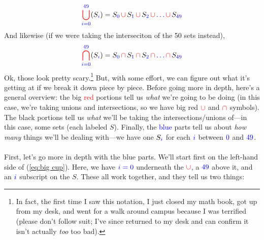 \documentclass[10pt]{article}
\theoremstyle{definition}
\let\oldref\ref
\renewcommand{\ref}[1]{(\oldref{#1})}
\begin{document}
\begin{equation}\label{eq:big cup}
{\color{red}\bigcup^{{\color{blue}49}}_{\color{blue}i={0}}}(S_{\color{blue}i}) = S_{\color{blue}0}\,{\color{red}\cup}\,S_{\color{blue}1}\,{\color{red}\cup} \,S_{\color{blue}2} \,{\color{red}\cup} \,{\color{blue}\ldots} \,{\color{red}\cup}\, S_{\color{blue}49}
\end{equation}
And likewise (if we were taking the interseciton of the 50 sets instead),
\begin{equation}\label{eq:big cap}
{\color{red}\bigcap^{{\color{blue}49}}_{\color{blue}i=0}}(S_{\color{blue}i}) = S_{\color{blue}0}\,{\color{red}\cap}\,S_{\color{blue}1}\,{\color{red}\cap} \,S_{\color{blue}2} \,{\color{red}\cap} \,{\color{blue}\ldots} \,{\color{red}\cap}\, S_{\color{blue}49}
\end{equation}
Ok, those look pretty scary.\footnote{In fact, the first time I saw this notation, I just closed my math book, got up from my desk, and went for a walk around campus because I was terrified (please don't follow suit; I've since returned to my desk and can confirm it isn't actually \emph{too} too bad).}  But, with some effort, we can figure out what it's getting at if we break it down piece by piece.  Before going more in depth, here's a general overview: the big \textcolor{red}{red} portions tell us \emph{what} we're going to be doing (in this case, we're taking unions and intersections, so we have big red $\color{red}\cup$ and $\color{red}\cap$ symbols).  The black portions tell us \emph{what} we'll be taking the intersections/unions of---in this case, some sets (each labeled $S$).  Finally, the \textcolor{blue}{blue} parts tell us about \emph{how many} things we'll be dealing with---we have one $S_{\color{blue}i}$ for each $\color{blue}i$ between $\color{blue}0$ and $\color{blue}49$.  \\~\\
First, let's go more in depth with the blue parts.  We'll start first on the left-hand side of \ref{eq:big cup}.  Here, we have $\color{blue}i=0$ underneath the $\color{red}\cup$, a $\color{blue}49$ above it, and an $\color{blue}i$ subscript on the $S$.  These all work together, and they tell us two things:
\end{document}
